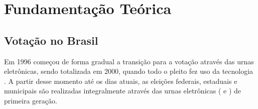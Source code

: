 \documentclass[portuguese]{textolivre}
\begin{document}
	
	\section{Fundamentação Teórica \label{fundamentacaoteorica}}
	
	
	
	
	\subsection{Votação no Brasil}
	
	
	Em 1996 começou de forma gradual a transição para a votação através das urnas eletrônicas, sendo totalizada em 2000, quando todo o pleito fez uso da tecnologia \cite{machado2021vulnerabilidade}. A partir desse momento até os dias atuais, as eleições federais, estaduais e municipais são realizadas integralmente através das urnas eletrônicas ( e ) de primeira geração.
	
\end{document}
